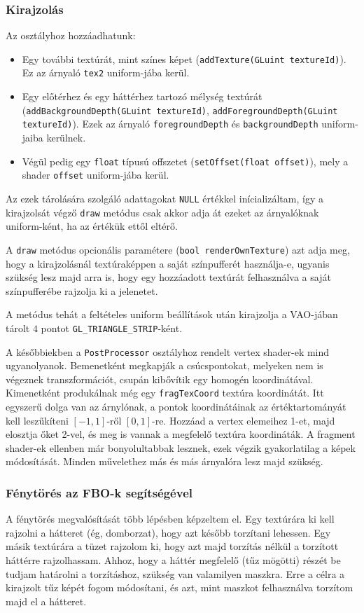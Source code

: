 \subsubsection{Kirajzolás}
Az osztályhoz hozzáadhatunk:
\begin{itemize}
\item Egy további textúrát, mint színes képet (\texttt{addTexture(GLuint textureId)}). Ez az árnyaló \texttt{tex2} uniform-jába kerül.
\item Egy előtérhez és egy háttérhez tartozó mélység textúrát (\texttt{addBackgroundDepth(GLuint textureId)}, \texttt{addForegroundDepth(GLuint textureId)}).  Ezek az árnyaló \texttt{foregroundDepth} és \texttt{backgroundDepth} uniform-jaiba kerülnek.
\item Végül pedig egy \texttt{float} típusú offszetet (\texttt{setOffset(float offset)}), mely a shader \texttt{offset} uniform-jába kerül.
\end{itemize}
Az ezek tárolására szolgáló adattagokat \texttt{NULL} értékkel inícializáltam, így a kirajzolsát végző \texttt{draw} metódus csak akkor adja át ezeket az árnyalóknak uniform-ként, ha az értékük ettől eltérő. 

A \texttt{draw} metódus opcionális paramétere (\texttt{bool renderOwnTexture}) azt adja meg, hogy a kirajzolásnál textúraképpen a saját színpufferét használja-e, ugyanis szükség lesz majd arra is, hogy egy hozzáadott textúrát felhasználva a saját színpufferébe rajzolja ki a jelenetet.

A metódus tehát a feltételes uniform beállítások után kirajzolja a VAO-jában tárolt $4$ pontot \texttt{GL\_TRIANGLE\_STRIP}-ként.

A későbbiekben a \texttt{PostProcessor} osztályhoz rendelt vertex shader-ek mind ugyanolyanok. Bemenetként megkapják a csúcspontokat, melyeken nem is végeznek transzformációt, csupán kibővítik egy homogén koordinátával. Kimenetként produkálnak még egy \texttt{fragTexCoord} textúra koordinátát. Itt egyszerű dolga van az árnylónak, a pontok koordinátáinak az értéktartományát kell leszűkíteni $[-1, 1]$-ről $[0, 1]$-re. Hozzáad a vertex elemeihez 1-et, majd elosztja őket 2-vel, és meg is vannak a megfelelő textúra koordináták. A fragment shader-ek ellenben már bonyolultabbak lesznek, ezek végzik gyakorlatilag a képek módosítását. Minden művelethez más és más árnyalóra lesz majd szükség.

\subsubsection{Fénytörés az FBO-k segítségével}
A fénytörés megvalósítását több lépésben képzeltem el. Egy textúrára ki kell rajzolni a hátteret (ég, domborzat), hogy azt később torzítani lehessen. Egy másik textúrára a tüzet rajzolom ki, hogy azt majd torzítás nélkül a torzított háttérre rajzolhassam. Ahhoz, hogy a háttér megfelelő (tűz mögötti) részét be tudjam határolni a torzításhoz, szükség van valamilyen maszkra. Erre a célra a kirajzolt tűz képét fogom módosítani, és azt, mint maszkot felhasználva torzítom majd el a hátteret. 


